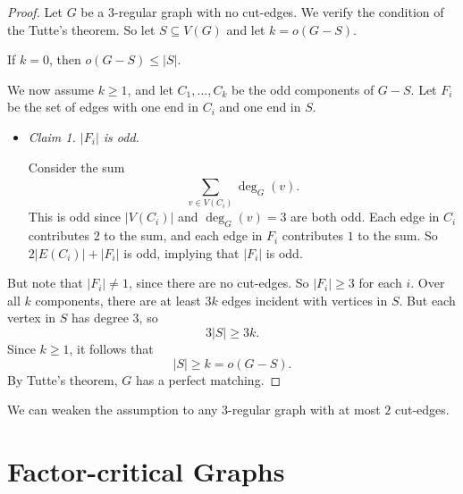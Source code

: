 \documentclass[co342]{subfiles}
\begin{document}
    \begin{proof}
        Let $G$ be a $3$-regular graph with no cut-edges. We verify the condition of the Tutte's theorem. So let $S\subseteq V\left( G \right)$ and let $k=o\left( G-S \right)$. 

        If $k=0$, then $o\left( G-S \right)\leq \left| S \right|$. 

        We now assume $k\geq 1$, and let $C_1,\ldots,C_k$ be the odd components of $G-S$. Let $F_i$ be the set of edges with one end in $C_i$ and one end in $S$.
        \begin{itemize}
            \item \textit{Claim 1. $\left| F_i \right|$ is odd.}

                \begin{subproof}
                    Consider the sum
                    \begin{equation*}
                        \sum^{}_{v\in V\left( C_i \right)}\deg_G\left( v \right).
                    \end{equation*}
                    This is odd since $\left| V\left( C_i \right) \right|$ and $\deg_G\left( v \right)=3$ are both odd. Each edge in $C_i$ contributes $2$ to the sum, and each edge in $F_i$ contributes $1$ to the sum. So $2\left| E\left( C_i \right) \right|+\left| F_i \right|$ is odd, implying that $\left| F_i \right|$ is odd.
                \end{subproof}
        \end{itemize} 
        But note that $\left| F_i \right|\neq 1$, since there are no cut-edges. So $\left| F_i \right|\geq 3$ for each $i$. Over all $k$ components, there are at least $3k$ edges incident with vertices in $S$. But each vertex in $S$ has degree $3$, so
        \begin{equation*}
            3\left| S \right|\geq 3k.
        \end{equation*}
        Since $k\geq 1$, it follows that
        \begin{equation*}
            \left| S \right|\geq k = o\left( G-S \right).
        \end{equation*}
        By Tutte's theorem, $G$ has a perfect matching.
    \end{proof}

    \np We can weaken the assumption to any $3$-regular graph with at most $2$ cut-edges.

    \section{Factor-critical Graphs}
    
\end{document}
